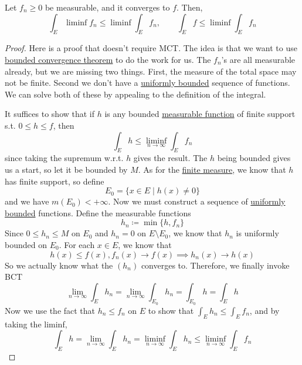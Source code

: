   \begin{lemma}
    \label{thm:fatous-lemma}
    Let $f_n \geq 0$ be measurable, and it converges to $f$. Then, 
    \begin{equation}
      \int_E \liminf{f_n} \leq \liminf \int_E f_n, \qquad \int_E f \leq \liminf \int_E f_n
    \end{equation}
  \end{lemma}
  \begin{proof}
    Here is a proof that doesn't require MCT. The idea is that we want to use \hyperref[thm:bounded-convergence-theorem]{bounded convergence theorem} to do the work for us. The $f_n$'s are all measurable already, but we are missing two things. First, the measure of the total space may not be finite. Second we don't have a \hyperref[real-def:uniformly-bounded]{uniformly bounded} sequence of functions. We can solve both of these by appealing to the definition of the integral. 

    It suffices to show that if $h$ is any bounded \hyperref[def:measurable-function]{measurable function} of finite support s.t. $0 \leq h \leq f$, then 
    \begin{equation}
      \int_E h \leq \liminf_{n \to \infty} \int_E f_n 
    \end{equation}
    since taking the supremum w.r.t. $h$ gives the result. The $h$ being bounded gives us a start, so let it be bounded by $M$. As for the \hyperref[def:finite-measure]{finite measure}, we know that $h$ has finite support, so define 
    \begin{equation}
      E_0 = \{x  \in E \mid h(x) \neq 0 \}
    \end{equation}
    and we have $m(E_0) < +\infty$. Now we must construct a sequence of \hyperref[real-def:uniformly-bounded]{uniformly bounded} functions. Define the measurable functions
    \begin{equation}
      h_n \coloneqq \min\{ h, f_n \}
    \end{equation}
    Since $0 \leq h_n \leq M$ on $E_0$ and $h_n = 0$ on $E \setminus E_0$, we know that $h_n$ is uniformly bounded on $E_0$. For each $x \in E$, we know that 
    \begin{equation}
      h(x) \leq f(x), f_n (x) \to f(x) \implies h_n (x) \to h(x)
    \end{equation}
    So we actually know what the $(h_n)$ converges to. Therefore, we finally invoke BCT 
    \begin{equation}
      \lim_{n \to \infty} \int_E h_n = \lim_{n \to \infty} \int_{E_0} h_n = \int_{E_0} h = \int_E h
    \end{equation}
    Now we use the fact that $h_n \leq f_n$ on $E$ to show that $\int_E h_n \leq \int_E f_n$, and by taking the liminf, 
    \begin{equation}
      \int_E h = \lim_{n \to \infty} \int_E h_n = \liminf_{n \to \infty} \int_E h_n \leq \liminf_{n \to \infty} \int_E f_n 
    \end{equation}
  \end{proof}
